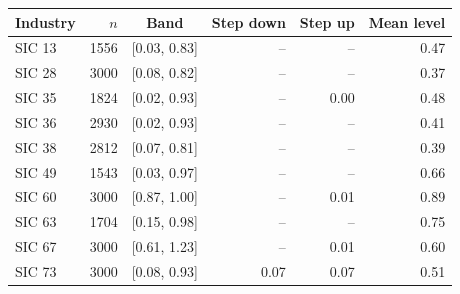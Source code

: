 \begin{tabular}{lrcrrr}\toprule
Industry & $n$ & Band & Step down & Step up & Mean level\\\midrule
SIC 13 & 1556 & [0.03, 0.83] & -- & -- & 0.47\\
SIC 28 & 3000 & [0.08, 0.82] & -- & -- & 0.37\\
SIC 35 & 1824 & [0.02, 0.93] & -- & 0.00 & 0.48\\
SIC 36 & 2930 & [0.02, 0.93] & -- & -- & 0.41\\
SIC 38 & 2812 & [0.07, 0.81] & -- & -- & 0.39\\
SIC 49 & 1543 & [0.03, 0.97] & -- & -- & 0.66\\
SIC 60 & 3000 & [0.87, 1.00] & -- & 0.01 & 0.89\\
SIC 63 & 1704 & [0.15, 0.98] & -- & -- & 0.75\\
SIC 67 & 3000 & [0.61, 1.23] & -- & 0.01 & 0.60\\
SIC 73 & 3000 & [0.08, 0.93] & 0.07 & 0.07 & 0.51\\
\bottomrule\end{tabular}
